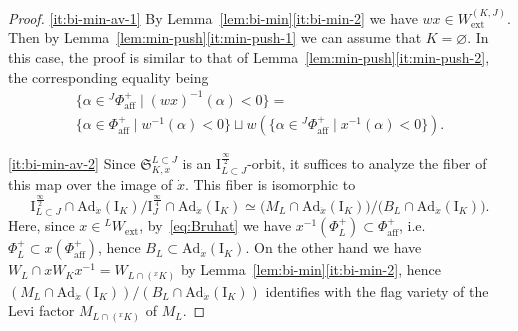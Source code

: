 \documentclass[11pt]{amsart}
\numberwithin{equation}{section}
\theoremstyle{plain}
\theoremstyle{definition}
\newcommand{\I}{{\mathrm I}}
\newcommand{\rQ}{{\mathrm Q}}
\newcommand{\X}{{\mathbb X}}
\newcommand{\Xd}{\check{\X}}
\newcommand{\xs}{{\ \xrightarrow{\sim}\ }}
\newcommand{\Ad}{\mathrm{Ad}}
\newcommand{\semi}{{{\frac{\infty}{2}}}}
\newcommand{\quar}{{{\frac{\infty}{4}}}}
\newcommand{\ex}{\mathrm{ext}}
\newcommand{\af}{\mathrm{aff}}
\newcommand{\rS}{\mathfrak{S}}
\begin{document}
\begin{proof}
\eqref{it:bi-min-av-1}
By Lemma~\ref{lem:bi-min}\eqref{it:bi-min-2} we have $wx \in W_\ex^{(K,J)}$. Then by Lemma~\ref{lem:min-push}\eqref{it:min-push-1} we can assume that $K=\varnothing$. In this case, 
the proof is similar to that of Lemma~\ref{lem:min-push}\eqref{it:min-push-2}, the corresponding equality being
\begin{multline*}
\{\alpha \in {}^J \Phi_\af^+ \mid (wx)^{-1} (\alpha) <0\} = \\
\{\alpha \in \Phi_\af^+ \mid w^{-1}(\alpha)<0\} \sqcup w(\{\alpha \in {}^J \Phi_\af^+ \mid x^{-1}(\alpha)<0\}).
\end{multline*}

\eqref{it:bi-min-av-2}
Since $\rS_{K,x}^{L \subset J}$ is an $\I^\semi_{L \subset J}$-orbit,
it suffices to analyze the fiber of this map over the image of $\dot{x}$.
This fiber is isomorphic to 
\[
\I^\semi_{L \subset J} \cap \Ad_{\dot{x}}(\I_K)/\I^\quar_J\cap \Ad_{\dot{x}}(\I_K)
\simeq \bigl( M_L \cap \Ad_{\dot{x}}(\I_K) \bigr) / \bigl( B_L \cap \Ad_{\dot{x}}(\I_K) \bigr). 
\]
Here, since $x \in {}^L W_\ex$, by~\eqref{eq:Bruhat} we have $x^{-1}(\Phi_L^+) \subset \Phi_\af^+$, i.e.~$\Phi_L^+ \subset x(\Phi_\af^+)$, hence $B_L \subset \Ad_{\dot{x}}(\I_K)$. On the other hand we have $W_L \cap x W_K x^{-1} = W_{L \cap ({}^xK)}$ by Lem\-ma~\ref{lem:bi-min}\eqref{it:bi-min-2}, hence $(M_L \cap \Ad_{\dot{x}}(\I_K)) / (B_L \cap \Ad_{\dot{x}}(\I_K))$ identifies with the flag variety of the Levi factor $M_{L\cap ({}^xK)}$ of $M_L$.



\end{proof}
\end{document}
